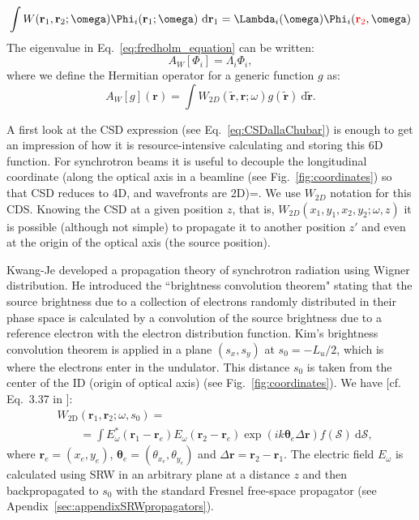 \documentclass{iucr}              %
\newcommand{\inred}[1]{{\color{red}#1}}
\begin{document}
\begin{equation}\label{eq:fredholm_equation}
\int W(\textbf{r}_1,\textbf{r}_2;\omega)
\Phi_i(\textbf{r}_1;\omega)~\text{d}\textbf{r}_1  = \Lambda_i(\omega) \Phi_i(\inred{\textbf{r}_2},\omega)
\end{equation}
The eigenvalue in Eq.~\ref{eq:fredholm_equation} can be written: 
\begin{equation}
A_{W}[\Phi_i] = \Lambda_i \Phi_i,
\end{equation}
where we define the Hermitian operator for a generic function $g$ as:
\begin{equation}\label{eq:Hermitian}
A_{W}[g](\textbf{r})  = \int W_{2D}(\tilde{\textbf{r}},\textbf{r};\omega) g(\tilde{\textbf{r}})~ \text{d}\tilde{\textbf{r}}.
\end{equation}

A first look at the CSD expression (see Eq.~\ref{eq:CSDallaChubar}) is enough to get an impression of how it is resource-intensive calculating and storing this 6D function. For synchrotron beams it is useful to decouple the longitudinal coordinate (along the optical axis in a beamline (see Fig.~\ref{fig:coordinates}) so that CSD reduces to 4D, and wavefronts are 2D)=. We use $W_{2D}$ notation for this CDS.  Knowing the CSD at a given position $z$, that is, $W_{2D}(x_1,y_1,x_2,y_2; \omega, z)$ it is possible (although not simple) to propagate it to another position $z'$ and even at the origin of the optical axis (the source position).

Kwang-Je  developed a propagation theory of synchrotron radiation using Wigner distribution. He introduced the ``brightness convolution theorem" stating that the source brightness due to a collection of electrons randomly distributed in their phase space is calculated by a convolution of the source brightness due to a reference electron with the electron distribution function. 
Kim's brightness convolution theorem is applied in a plane $(s_x,s_y)$ at $s_0=-L_u\big/2$, which is where the  electrons enter in the undulator. This distance $s_0$ is taken from the center of the ID (origin of optical axis) (see Fig.~\ref{fig:coordinates}). We have [cf. Eq.~3.37 in \cite{glassThesis}]:
\begin{equation}\label{eq:comsyl_W2D}
\begin{split}
& W_\text{2D}(\textbf{r}_1,\textbf{r}_2;\omega,s_0) = \\
&\qquad=\int E_\omega^*(\textbf{r}_1-\textbf{r}_e)
    E_\omega(\textbf{r}_2-\textbf{r}_e) \exp(i k \mathbf{\theta}_e\Delta\textbf{r})f(\mathcal{S})~\text{d}\mathcal{S},
\end{split}
\end{equation}
where $\textbf{r}_e=(x_e,y_e)$, $\mathbf{\theta}_e=(\theta_{x_e},\theta_{y_e})$ and $\Delta\textbf{r}=\textbf{r}_2-\textbf{r}_1$. The electric field $E_\omega$ is calculated using SRW in an arbitrary plane at a distance $z$ and then backpropagated to $s_0$ with the standard Fresnel free-space propagator (see Apendix~\ref{sec:appendixSRWpropagators}).
\end{document}
